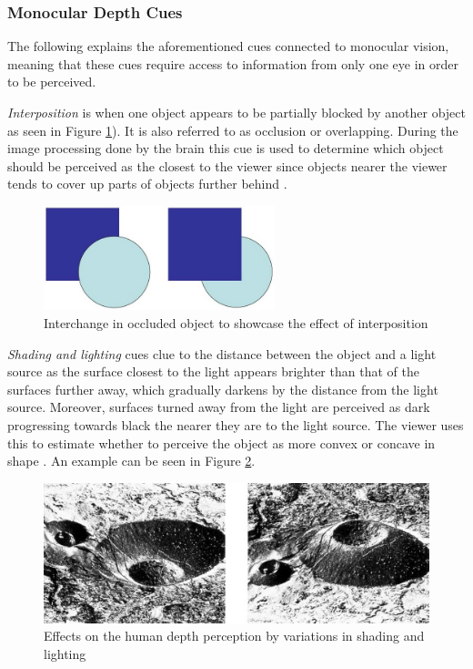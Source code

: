 \subsubsection{Monocular Depth Cues}
The following explains the aforementioned cues connected to monocular vision, meaning that these cues require access to information from only one eye in order to be perceived.

\textit{Interposition} is when one object appears to be partially blocked by another object as seen in Figure \ref{fig:cue0}). It is also referred to as occlusion or overlapping. During the image processing done by the brain this cue is used to determine which object should be perceived as the closest to the viewer since objects nearer the viewer tends to cover up parts of objects further behind \cite{Gale}.

\begin{figure}[h!]
   \centering
   \includegraphics[width=0.6\textwidth]{figures/cue0.jpg}
   \caption{Interchange in occluded object to showcase the effect of interposition \cite{Heeger}}\label{fig:cue0}
\end{figure}

\textit{Shading and lighting} cues clue to the distance between the object and a light source as the surface closest to the light appears brighter than that of the surfaces further away, which gradually darkens by the distance from the light source. Moreover, surfaces turned away from the light are perceived as dark progressing towards black the nearer they are to the light source. The viewer uses this to estimate whether to perceive the object as more convex or concave in shape \cite{Gale}. An example can be seen in Figure \ref{fig:cue1}.

\begin{figure}[h!]
   \centering
   \includegraphics[width=\textwidth]{figures/cue1.jpg}
   \caption{Effects on the human depth perception by variations in shading and lighting \cite{Heeger}}\label{fig:cue1}
\end{figure}


